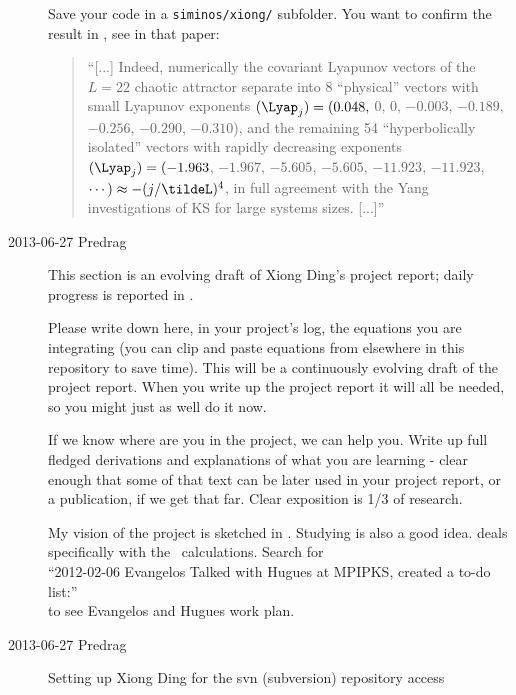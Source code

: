 \begin{description}
Save your code in a \texttt{siminos/xiong/} subfolder. You want to
confirm the result in , see
 in
that paper:

\begin{quote}
``[...] Indeed, numerically the covariant Lyapunov
vectors of the $L=22$ chaotic attractor separate
into 8 ``physical'' vectors with small Lyapunov exponents
$(\Lyap_j) = (0.048,$ 0, 0, $-0.003$, $-0.189$, $-0.256$,
$-0.290$, $-0.310$),
and the remaining 54 ``hyperbolically isolated'' vectors with rapidly
decreasing exponents
$(\Lyap_j)
= (-1.963$,   $-1.967$,   $-5.605$,   $-5.605$,  $-11.923$,  $-11.923$,
 $\cdots) \approx -(j/\tildeL)^4$,
in full agreement with the Yang \etal{} investigations
of KS for large systems sizes.
 [...]''
\end{quote}

\item[2013-06-27 Predrag]
This section is an evolving draft of Xiong Ding's project report;
daily progress is reported in .


Please {\color{red} write down here}, in your project's
log, the equations you are integrating (you can clip and paste
equations from elsewhere in this repository to save time).
This will be a continuously evolving draft of the project report.
When you
write up the project report it will all be needed, so you might just
as well do it now.

If we know where are you in the project, we can help you.
Write up full fledged
derivations and explanations of what you are learning - clear enough
that some of that text can be later used in your project report, or a
publication, if we get that far. Clear exposition is 1/3 of research.



My vision of the project is sketched in . Studying
 is also a good idea. 
deals specifically with the \KS\ calculations.
Search for\\
``2012-02-06 Evangelos Talked with Hugues at MPIPKS, created a to-do list:''
\\
to see Evangelos and Hugues work plan.

\item[2013-06-27 Predrag]
Setting up Xiong Ding for the svn (subversion) repository access


\end{description}
